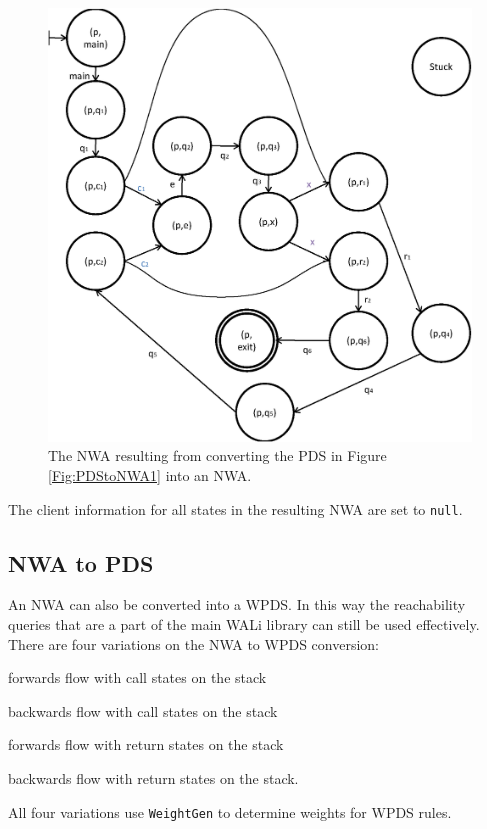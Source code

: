 \documentclass{llncs}
\begin{document}
\begin{figure}[htbp]
  \centering
    \includegraphics[width=12cm]{Figures/Figure22.eps}
  \caption{The NWA resulting from converting the PDS in Figure \ref{Fig:PDStoNWA1} into an NWA.}
  \label{Fig:PDStoNWA2}
\end{figure}

The client information for all states in the resulting NWA are set to \texttt{null}.

\subsection{NWA to PDS}
\label{Se:NWAtoPDS}

An NWA can also be converted into a WPDS.  In this way the reachability queries that are a part of the main WALi library can still be used effectively.  There are four variations on the NWA to WPDS conversion: \begin{inparaenum} \item forwards flow with call states on the stack \item backwards flow with call states on the stack \item forwards flow with return states on the stack \item backwards flow with return states on the stack. \end{inparaenum}  All four variations use \texttt{WeightGen} to determine weights for WPDS rules.
\end{document}
